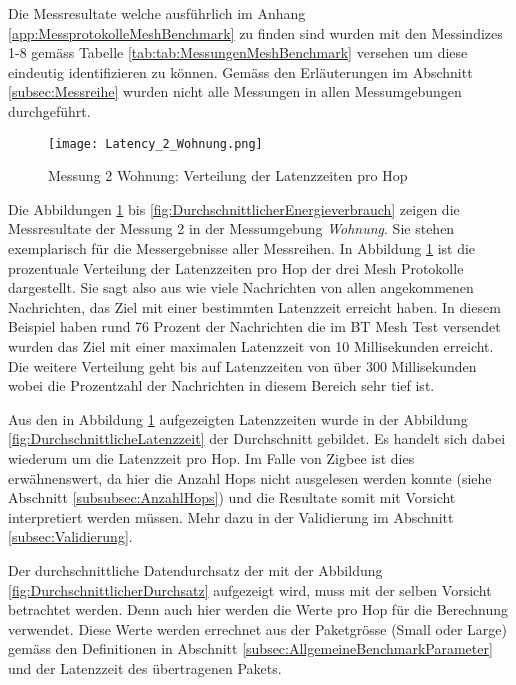 Die Messresultate welche ausführlich im Anhang \ref{app:MessprotokolleMeshBenchmark} zu finden sind wurden mit den Messindizes 1-8 gemäss Tabelle \ref{tab:tab:MessungenMeshBenchmark} versehen um diese eindeutig identifizieren zu können.
Gemäss den Erläuterungen im Abschnitt \ref{subsec:Messreihe} wurden nicht alle Messungen in allen Messumgebungen durchgeführt.

\begin{figure}[h]
	\centering
	\texttt{[image: Latency\_2\_Wohnung.png]}
	\caption{Messung 2 Wohnung: Verteilung der Latenzzeiten pro Hop}
	\label{fig:VerteilungderLatenzzeiten}
\end{figure}

Die Abbildungen \ref{fig:VerteilungderLatenzzeiten} bis \ref{fig:DurchschnittlicherEnergieverbrauch} zeigen die Messresultate der Messung 2 in der Messumgebung \textit{Wohnung}. Sie stehen exemplarisch für die Messergebnisse aller Messreihen.
In Abbildung \ref{fig:VerteilungderLatenzzeiten} ist die prozentuale Verteilung der Latenzzeiten pro Hop der drei Mesh Protokolle dargestellt.
Sie sagt also aus wie viele Nachrichten von allen angekommenen Nachrichten, das Ziel mit einer bestimmten Latenzzeit erreicht haben.
In diesem Beispiel haben rund 76 Prozent der Nachrichten die im BT Mesh Test versendet wurden das Ziel mit einer maximalen Latenzzeit von 10 Millisekunden erreicht.
Die weitere Verteilung geht bis auf Latenzzeiten von über 300 Millisekunden wobei die Prozentzahl der Nachrichten in diesem Bereich sehr tief ist.

Aus den in Abbildung \ref{fig:VerteilungderLatenzzeiten} aufgezeigten Latenzzeiten wurde in der Abbildung \ref{fig:DurchschnittlicheLatenzzeit} der Durchschnitt gebildet. Es handelt sich dabei wiederum um die Latenzzeit pro Hop. Im Falle von Zigbee ist dies erwähnenswert, da hier die Anzahl Hops nicht ausgelesen werden konnte (siehe Abschnitt \ref{subsubsec:AnzahlHops}) und die Resultate somit mit Vorsicht interpretiert werden müssen. Mehr dazu in der Validierung im Abschnitt \ref{subsec:Validierung}.

Der durchschnittliche Datendurchsatz der mit der Abbildung \ref{fig:DurchschnittlicherDurchsatz} aufgezeigt wird, muss mit der selben Vorsicht betrachtet werden. Denn auch hier werden die Werte pro Hop für die Berechnung verwendet.
Diese Werte werden errechnet aus der Paketgrösse (Small oder Large) gemäss den Definitionen in Abschnitt \ref{subsec:AllgemeineBenchmarkParameter} und der Latenzzeit des übertragenen Pakets.


